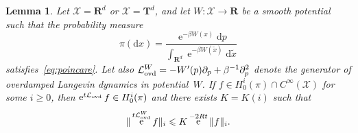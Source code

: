 \documentclass[11pt,a4paper]{article}
\DeclareMathOperator{\e}{e}
\newcommand{\real}{\mathbf R}
\newcommand{\torus}{\mathbf T}
\renewcommand{\d}{\mathrm d}
\theoremstyle{plain}
\newtheorem{lemma}{Lemma}[section]
\numberwithin{equation}{section}
\renewcommand{\leq}{\leqslant}
\renewcommand{\geq}{\geqslant}
\begin{document}
\begin{lemma}
    \label{lemma:overdamped_langevin_decay_derivatives}
    Let $\mathcal X = \real^d$ or $\mathcal X = \torus^d$,
    and let $W: \mathcal X \to \real$ be a smooth potential such that the probability measure
    \[
        \pi(\d x) = \frac{\e^{- \beta W(x)} \d p}{\int_{\real^d} \e^{-\beta W(\widetilde x)} \d \widetilde x}
    \]
    satisfies~\eqref{eq:poincare}.
    Let also $\mathcal L_{\rm ovd}^W = - W'(p) \partial_p + \beta^{-1} \partial_p^2$ denote the generator of overdamped Langevin dynamics in potential~$W$.
    If $f \in H^i_0(\pi) \cap C^{\infty}(\mathcal X)$ for some $i \geq 0$,
    then $\e^{t \mathcal L_{\rm ovd}} f \in H^i_0(\pi)$ and there exists $K = K(i)$ such that
    \[
        \norm*{\e^{t \mathcal L_{\rm ovd}^W} f}_i \leq K \e^{- 2 R t} \norm*{f}_i.
    \]
\end{lemma}
\end{document}
